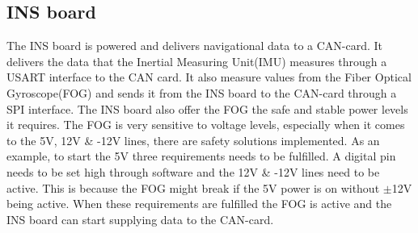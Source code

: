 \subsection{INS board}
The INS board is powered and delivers navigational data to a CAN-card. It delivers the data that the Inertial Measuring Unit(IMU) measures through a USART interface to the CAN card. It also measure values from the Fiber Optical Gyroscope(FOG) and sends it from the INS board to the CAN-card through a SPI interface. The INS board also offer the FOG the safe and stable power levels it requires. The FOG is very sensitive to voltage levels, especially when it comes to the 5V, 12V \& -12V lines, there are safety solutions implemented. As an example, to start the 5V three requirements needs to be fulfilled. A digital pin needs to be set high through software and the 12V \& -12V lines need to be active. This is because the FOG might break if the 5V power is on without $\pm$12V being active. When these requirements are fulfilled the FOG is active and the INS board can start supplying data to the CAN-card.
	

